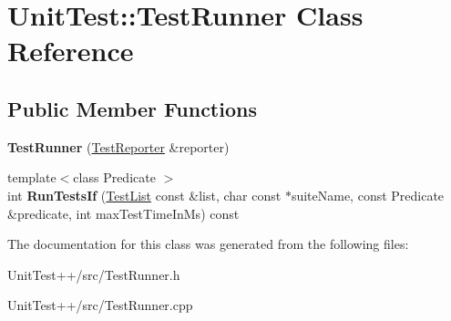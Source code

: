 \hypertarget{classUnitTest_1_1TestRunner}{\section{Unit\-Test\-:\-:Test\-Runner Class Reference}
\label{classUnitTest_1_1TestRunner}
}
\subsection*{Public Member Functions}
\begin{DoxyCompactItemize}
\item 
\hypertarget{classUnitTest_1_1TestRunner_abef5ed23197231f816a6aa63ec0ba535}{{\bfseries Test\-Runner} (\hyperlink{classUnitTest_1_1TestReporter}{Test\-Reporter} \&reporter)}\label{classUnitTest_1_1TestRunner_abef5ed23197231f816a6aa63ec0ba535}

\item 
\hypertarget{classUnitTest_1_1TestRunner_abf4a427b7b7984c989907a848020b3b1}{{\footnotesize template$<$class Predicate $>$ }\\int {\bfseries Run\-Tests\-If} (\hyperlink{classUnitTest_1_1TestList}{Test\-List} const \&list, char const $\ast$suite\-Name, const Predicate \&predicate, int max\-Test\-Time\-In\-Ms) const }\label{classUnitTest_1_1TestRunner_abf4a427b7b7984c989907a848020b3b1}

\end{DoxyCompactItemize}


The documentation for this class was generated from the following files\-:\begin{DoxyCompactItemize}
\item 
Unit\-Test++/src/Test\-Runner.\-h\item 
Unit\-Test++/src/Test\-Runner.\-cpp\end{DoxyCompactItemize}
